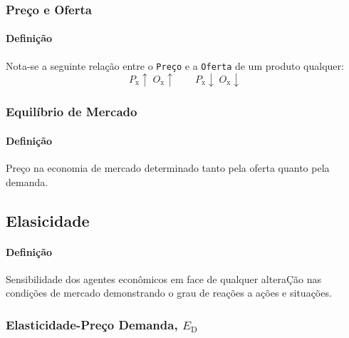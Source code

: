 \documentclass{article}
\begin{document}
        \subsubsection{Preço e Oferta}
            \paragraph{Definição}Nota-se a seguinte relação entre o \texttt{Preço} e a \texttt{Oferta} de um produto qualquer:
                \begin{equation}
                    \boxed{
                        P_{\text{x}}\uparrow
                        \;
                        O_{\text{x}}\uparrow
                    }
                    \qquad
                    \boxed{
                        P_{\text{x}}\downarrow
                        \;
                        O_{\text{x}}\downarrow
                    }
                \end{equation}

        \subsubsection{Equilíbrio de Mercado}
            \paragraph{Definição}Preço na economia de mercado determinado tanto pela oferta quanto pela demanda.


        \subsection{Elasicidade}
            \paragraph{Definição}Sensibilidade dos agentes econômicos em face de qualquer alteraÇão nas condições de mercado demonstrando o grau de reações a ações e situações.

        \subsubsection{Elasticidade-Preço Demanda, $E_{\text{D}}$}
\end{document}
